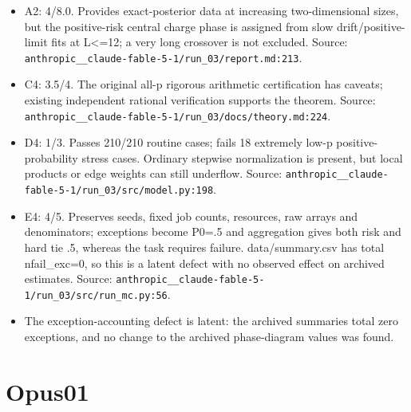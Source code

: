 \documentclass[11pt,a4paper]{article}
\begin{document}
\begin{itemize}
\item A2: 4/\allowbreak{}8.0. Provides exact-posterior data at increasing two-dimensional sizes, but the positive-risk central charge phase is assigned from slow drift/\allowbreak{}positive-limit fits at L<=12; a very long crossover is not excluded. Source: \nolinkurl{anthropic__claude-fable-5-1/run_03/report.md:213}.
\item C4: 3.5/\allowbreak{}4. The original all-p rigorous arithmetic certification has caveats; existing independent rational verification supports the theorem. Source: \nolinkurl{anthropic__claude-fable-5-1/run_03/docs/theory.md:224}.
\item D4: 1/\allowbreak{}3. Passes 210/\allowbreak{}210 routine cases; fails 18 extremely low-p positive-probability stress cases. Ordinary stepwise normalization is present, but local products or edge weights can still underflow. Source: \nolinkurl{anthropic__claude-fable-5-1/run_03/src/model.py:198}.
\item E4: 4/\allowbreak{}5. Preserves seeds, fixed job counts, resources, raw arrays and denominators; exceptions become P0=.5 and aggregation gives both risk and hard tie .5, whereas the task requires failure. data/\allowbreak{}summary.csv has total nfail\_exc=0, so this is a latent defect with no observed effect on archived estimates. Source: \nolinkurl{anthropic__claude-fable-5-1/run_03/src/run_mc.py:56}.
\item The exception-accounting defect is latent: the archived summaries total zero exceptions, and no change to the archived phase-diagram values was found.
\end{itemize}

\section*{Opus01}
\end{document}
